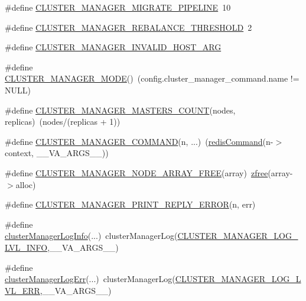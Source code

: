 \begin{DoxyCompactItemize}
\item 
\#define \hyperlink{redis-cli_8c_a1c331cc6d2c264a5c4aa2f1d3fd04612}{C\+L\+U\+S\+T\+E\+R\+\_\+\+M\+A\+N\+A\+G\+E\+R\+\_\+\+M\+I\+G\+R\+A\+T\+E\+\_\+\+P\+I\+P\+E\+L\+I\+NE}~10
\item 
\#define \hyperlink{redis-cli_8c_aff0139f75eea9a481892bbc700c28fa5}{C\+L\+U\+S\+T\+E\+R\+\_\+\+M\+A\+N\+A\+G\+E\+R\+\_\+\+R\+E\+B\+A\+L\+A\+N\+C\+E\+\_\+\+T\+H\+R\+E\+S\+H\+O\+LD}~2
\item 
\#define \hyperlink{redis-cli_8c_a88576a9cdde52411cc13c30b4594a68f}{C\+L\+U\+S\+T\+E\+R\+\_\+\+M\+A\+N\+A\+G\+E\+R\+\_\+\+I\+N\+V\+A\+L\+I\+D\+\_\+\+H\+O\+S\+T\+\_\+\+A\+RG}
\item 
\#define \hyperlink{redis-cli_8c_ab70fc07087205dc2620d11d8bc15dc95}{C\+L\+U\+S\+T\+E\+R\+\_\+\+M\+A\+N\+A\+G\+E\+R\+\_\+\+M\+O\+DE}()~(config.\+cluster\+\_\+manager\+\_\+command.\+name != N\+U\+LL)
\item 
\#define \hyperlink{redis-cli_8c_a17128b6803dd532edf67a83c45f6655a}{C\+L\+U\+S\+T\+E\+R\+\_\+\+M\+A\+N\+A\+G\+E\+R\+\_\+\+M\+A\+S\+T\+E\+R\+S\+\_\+\+C\+O\+U\+NT}(nodes,  replicas)~(nodes/(replicas + 1))
\item 
\#define \hyperlink{redis-cli_8c_ae2d9b0745f04aa0abeb5c51a6b697cf7}{C\+L\+U\+S\+T\+E\+R\+\_\+\+M\+A\+N\+A\+G\+E\+R\+\_\+\+C\+O\+M\+M\+A\+ND}(n, ...)~(\hyperlink{structredis_command}{redis\+Command}(n-\/$>$context, \+\_\+\+\_\+\+V\+A\+\_\+\+A\+R\+G\+S\+\_\+\+\_\+))
\item 
\#define \hyperlink{redis-cli_8c_a93e1a95b07101b24a373e6dfade66ad2}{C\+L\+U\+S\+T\+E\+R\+\_\+\+M\+A\+N\+A\+G\+E\+R\+\_\+\+N\+O\+D\+E\+\_\+\+A\+R\+R\+A\+Y\+\_\+\+F\+R\+EE}(array)~\hyperlink{zmalloc_8h_ae6638523882220721b9e7cdc7b2cd58d}{zfree}(array-\/$>$alloc)
\item 
\#define \hyperlink{redis-cli_8c_a6ce40943079652c9c9dcaad59114176b}{C\+L\+U\+S\+T\+E\+R\+\_\+\+M\+A\+N\+A\+G\+E\+R\+\_\+\+P\+R\+I\+N\+T\+\_\+\+R\+E\+P\+L\+Y\+\_\+\+E\+R\+R\+OR}(n,  err)
\item 
\#define \hyperlink{redis-cli_8c_a151780f0b046e0c2fef2888d0963c1f5}{cluster\+Manager\+Log\+Info}(...)~cluster\+Manager\+Log(\hyperlink{redis-cli_8c_a0ba0eba292d87bc19292a61e473d4526}{C\+L\+U\+S\+T\+E\+R\+\_\+\+M\+A\+N\+A\+G\+E\+R\+\_\+\+L\+O\+G\+\_\+\+L\+V\+L\+\_\+\+I\+N\+FO},\+\_\+\+\_\+\+V\+A\+\_\+\+A\+R\+G\+S\+\_\+\+\_\+)
\item 
\#define \hyperlink{redis-cli_8c_acb3b620eb83ee84317de53670a257836}{cluster\+Manager\+Log\+Err}(...)~cluster\+Manager\+Log(\hyperlink{redis-cli_8c_af5844c375f96c311eae4a130e2c6faa3}{C\+L\+U\+S\+T\+E\+R\+\_\+\+M\+A\+N\+A\+G\+E\+R\+\_\+\+L\+O\+G\+\_\+\+L\+V\+L\+\_\+\+E\+RR},\+\_\+\+\_\+\+V\+A\+\_\+\+A\+R\+G\+S\+\_\+\+\_\+)

\end{DoxyCompactItemize}
